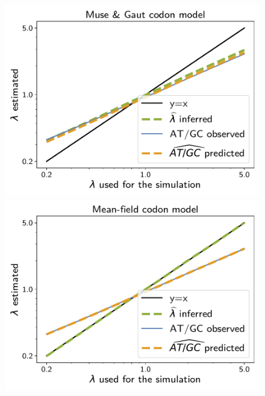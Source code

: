 \documentclass{article}
\begin{document}
\begin{figure}[!htb]
    \centering
    \begin{minipage}{0.325\linewidth}
        \includegraphics[width=\linewidth, page=1]{inference_supp_mat/PrimatesExons20Mu1.0_lambda_MG.pdf}
    \end{minipage}
    \hfill
    \begin{minipage}{0.325\linewidth}
        \includegraphics[width=\linewidth, page=1]{inference_supp_mat/PrimatesExons20Mu1.0_lambda_MF.pdf}
    \end{minipage}
    \hfill

\end{figure}
\end{document}
